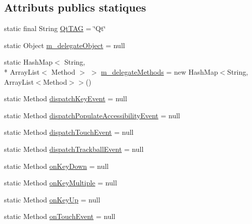 \subsection*{Attributs publics statiques}
\begin{DoxyCompactItemize}
\item 
static final String \hyperlink{classorg_1_1qtproject_1_1qt5_1_1android_1_1bindings_1_1_qt_application_acf8f3131e19aaef5fc2079bc530f42d6}{Qt\-T\-A\-G} = \char`\"{}Qt\char`\"{}
\item 
static Object \hyperlink{classorg_1_1qtproject_1_1qt5_1_1android_1_1bindings_1_1_qt_application_a8b778a94cf5468dfc07ae8f3e8d81148}{m\-\_\-delegate\-Object} = null
\item 
static Hash\-Map$<$ String, \\*
Array\-List$<$ Method $>$ $>$ \hyperlink{classorg_1_1qtproject_1_1qt5_1_1android_1_1bindings_1_1_qt_application_a5b32c9d8ce150fc1866812b13debbcfb}{m\-\_\-delegate\-Methods} = new Hash\-Map$<$String, Array\-List$<$Method$>$$>$()
\item 
static Method \hyperlink{classorg_1_1qtproject_1_1qt5_1_1android_1_1bindings_1_1_qt_application_a970719713bf7310b041b31dd6415fdcb}{dispatch\-Key\-Event} = null
\item 
static Method \hyperlink{classorg_1_1qtproject_1_1qt5_1_1android_1_1bindings_1_1_qt_application_a263117be3577f4976dc349a550cdb73f}{dispatch\-Populate\-Accessibility\-Event} = null
\item 
static Method \hyperlink{classorg_1_1qtproject_1_1qt5_1_1android_1_1bindings_1_1_qt_application_aa76cf4fe4b2ccebdca957464b7411745}{dispatch\-Touch\-Event} = null
\item 
static Method \hyperlink{classorg_1_1qtproject_1_1qt5_1_1android_1_1bindings_1_1_qt_application_acb66b3d0eafb07d1f13fb0a7ca4262bf}{dispatch\-Trackball\-Event} = null
\item 
static Method \hyperlink{classorg_1_1qtproject_1_1qt5_1_1android_1_1bindings_1_1_qt_application_a399e0ef76371331edc6aca47b4936dc6}{on\-Key\-Down} = null
\item 
static Method \hyperlink{classorg_1_1qtproject_1_1qt5_1_1android_1_1bindings_1_1_qt_application_a7098736b29503c41026ff60cca904094}{on\-Key\-Multiple} = null
\item 
static Method \hyperlink{classorg_1_1qtproject_1_1qt5_1_1android_1_1bindings_1_1_qt_application_a947623196f7f382c1c2bf0737697082d}{on\-Key\-Up} = null
\item 
static Method \hyperlink{classorg_1_1qtproject_1_1qt5_1_1android_1_1bindings_1_1_qt_application_ad8a6d1d7da859063ec8e5ba5b3db06c1}{on\-Touch\-Event} = null
$$
\end{DoxyCompactItemize}
